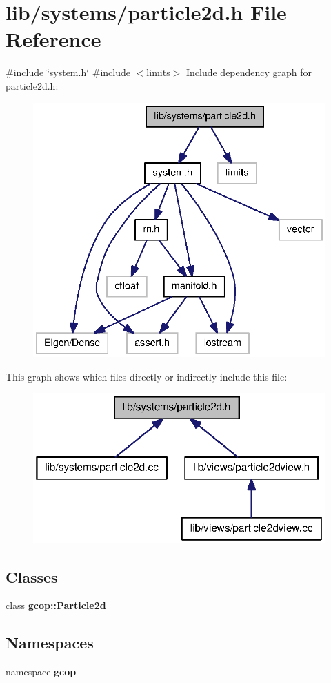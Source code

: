 \section{lib/systems/particle2d.h \-File \-Reference}
\label{particle2d_8h}
{\ttfamily \#include \char`\"{}system.\-h\char`\"{}}\*
{\ttfamily \#include $<$limits$>$}\*
\-Include dependency graph for particle2d.\-h\-:\nopagebreak
\begin{figure}[H]
\begin{center}
\leavevmode
\includegraphics[width=336pt]{particle2d_8h__incl}
\end{center}
\end{figure}
\-This graph shows which files directly or indirectly include this file\-:\nopagebreak
\begin{figure}[H]
\begin{center}
\leavevmode
\includegraphics[width=317pt]{particle2d_8h__dep__incl}
\end{center}
\end{figure}
\subsection*{\-Classes}
\begin{DoxyCompactItemize}
\item 
class {\bf gcop\-::\-Particle2d}
\end{DoxyCompactItemize}
\subsection*{\-Namespaces}
\begin{DoxyCompactItemize}
\item 
namespace {\bf gcop}
\end{DoxyCompactItemize}
